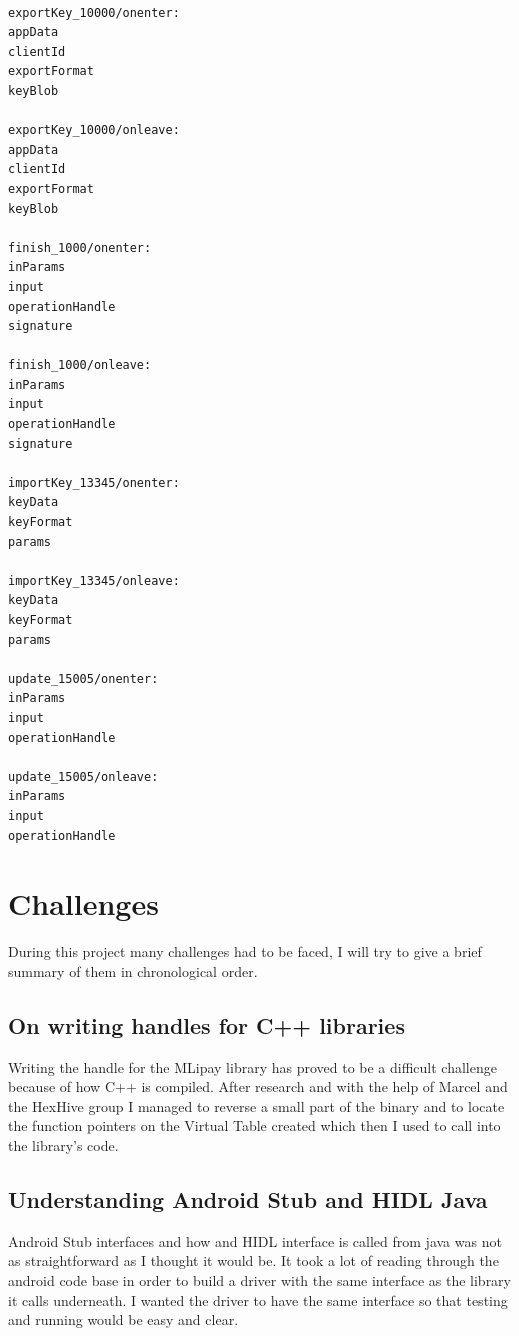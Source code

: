 \documentclass[a4paper,11pt,oneside]{report}
\begin{document}
\begin{lstlisting}[language=bash , caption=Example of seeds recorded for Keystore on HIKEY620]

exportKey_10000/onenter:
appData
clientId
exportFormat
keyBlob

exportKey_10000/onleave:
appData
clientId
exportFormat
keyBlob

finish_1000/onenter:
inParams
input
operationHandle
signature

finish_1000/onleave:
inParams
input
operationHandle
signature

importKey_13345/onenter:
keyData
keyFormat
params

importKey_13345/onleave:
keyData
keyFormat
params

update_15005/onenter:
inParams
input
operationHandle

update_15005/onleave:
inParams
input
operationHandle

\end{lstlisting}
\chapter{Challenges}
During this project many challenges had to be faced, I will try to give a brief summary of them in chronological order.
\section{On writing handles for C++ libraries}
Writing the handle for the MLipay library has proved
to be a difficult challenge because of how C++ is compiled. After research and with the help of Marcel and the HexHive group I managed to
reverse a small part of the binary and to locate the function pointers on the Virtual Table created which then I used to call into the library's code.
\section{Understanding Android Stub and HIDL Java}
Android Stub interfaces and how and HIDL interface
is called from java was not as straightforward as I
thought it would be. It took a lot of reading through
the android code base in order to build a driver with
the same interface as the library it calls underneath.
I wanted the driver to have the same interface so that testing and running would be easy and clear.
\end{document}
